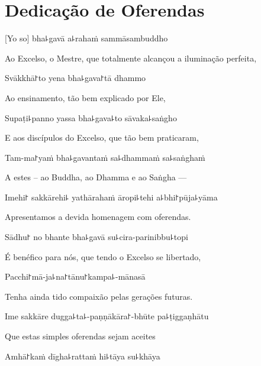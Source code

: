 \chapter{Dedicação de Oferendas}

[Yo so] bha꜕gavā a꜕rahaṁ sammāsambuddho

\begin{english}
Ao Excelso, o Mestre, que totalmente alcançou a iluminação perfeita,
\end{english}

Svākkhā꜓to yena bha꜕gava꜓tā dhammo

\begin{english}
Ao ensinamento, tão bem explicado por Ele,
\end{english}

Supaṭi꜕panno yassa bha꜕gava꜕to sāvaka꜕saṅgho

\begin{english}
E aos discípulos do Excelso, que tão bem praticaram,
\end{english}

Tam-ma꜓yaṁ bha꜕gavantaṁ sa꜕dhammaṁ sa꜕saṅghaṁ

\begin{english}
A estes – ao Buddha, ao Dhamma e ao Saṅgha ---
\end{english}

Imehi꜓ sakkārehi꜕ yathārahaṁ āropi꜕tehi a꜕bhi꜓pūja꜕yāma

\begin{english}
Apresentamos a devida homenagem com oferendas.
\end{english}

Sādhu꜓ no bhante bha꜕gavā su꜕cira-parinibbu꜕topi

\begin{english}
É benéfico para nós, que tendo o Excelso se libertado,
\end{english}

Pacchi꜓mā-ja꜕na꜓tānu꜓kampa꜕-mānasā

\begin{english}
Tenha ainda tido compaixão pelas gerações futuras.
\end{english}

Ime sakkāre dugga꜕ta꜕-paṇṇākāra꜓-bhūte pa꜕ṭiggaṇhātu

\begin{english}
Que estas simples oferendas sejam aceites
\end{english}

Amhā꜓kaṁ dīgha꜕rattaṁ hi꜕tāya su꜕khāya

